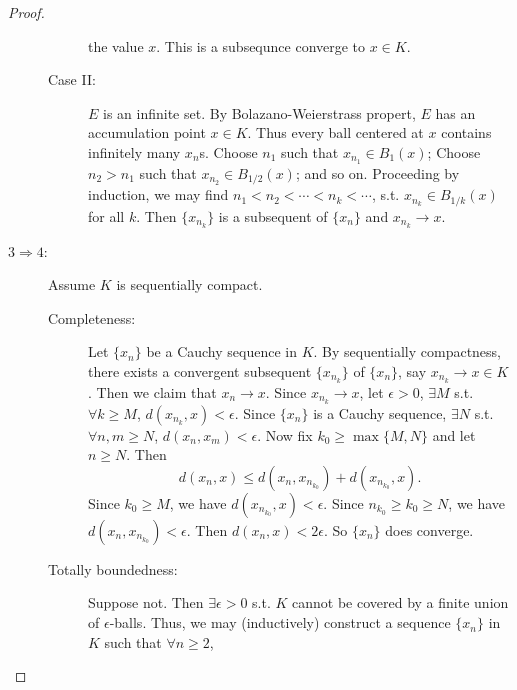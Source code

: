 \documentclass[12pt]{article}
\theoremstyle{plain}
\theoremstyle{definition}
\begin{document}
\begin{proof}
\begin{description}
\begin{description}
                    the value $x$.
                    This is a subsequnce converge to $x\in K$.
                \item[Case II:]
                    $E$ is an infinite set.
                    By Bolazano-Weierstrass propert, $E$ has an accumulation
                    point $x\in K$.
                    Thus every ball centered at $x$ contains infinitely many
                    $x_n$s.
                    Choose $n_1$ such that $x_{n_1}\in B_1(x)$;
                    Choose $n_2>n_1$ such that $x_{n_2}\in B_{1/2}(x)$; and so
                    on.
                    Proceeding by induction, we may find
                    $n_1<n_2<\cdots<n_k<\cdots$, s.t. $x_{n_k}\in B_{1/k}(x)$
                    for all $k$.
                    Then $\{x_{n_k}\}$ is a subsequent of $\{x_n\}$ and
                    $x_{n_k}\rightarrow x$.
            \end{description}
        \item[$3\Rightarrow 4$:]
            Assume $K$ is sequentially compact.
            \begin{description}
                \item[Completeness:]
                    Let $\{x_n\}$ be a Cauchy sequence in $K$.
                    By sequentially compactness, there exists a convergent
                    subsequent $\{x_{n_k}\}$ of $\{x_n\}$, say
                    $x_{n_k}\rightarrow x\in K$.
                    Then we claim that $x_n\rightarrow x$.
                    Since $x_{n_k}\rightarrow x$,
                    let $\epsilon>0$, $\exists M$ s.t. $\forall k\geq M$,
                    $d(x_{n_k},x)<\epsilon$.
                    Since $\{x_n\}$ is a Cauchy sequence, $\exists N$ s.t.
                    $\forall n,m\geq N$, $d(x_n,x_m)<\epsilon$.
                    Now fix $k_0\geq \max\{M,N\}$ and let $n\geq N$.
                    Then
                    $$d(x_n,x)\leq d(x_n,x_{n_{k_0}})+d(x_{n_{k_0}},x).$$
                    Since $k_0\geq M$, we have $d(x_{n_{k_0}},x)<\epsilon$.
                    Since $n_{k_0}\geq k_0\geq N$, we have $d(x_n,x_{n_{k_0}})<\epsilon$.
                    Then $d(x_n,x)<2\epsilon$. So $\{x_n\}$ does converge.
                \item[Totally boundedness:]
                    Suppose not.
                    Then $\exists \epsilon>0$ s.t. $K$ cannot be covered by a
                    finite union of $\epsilon$-balls.
                    Thus, we may (inductively) construct a sequence $\{x_n\}$ in
                    $K$ such that $\forall n\geq 2$,

\end{description}
\end{description}
\end{proof}
\end{document}
